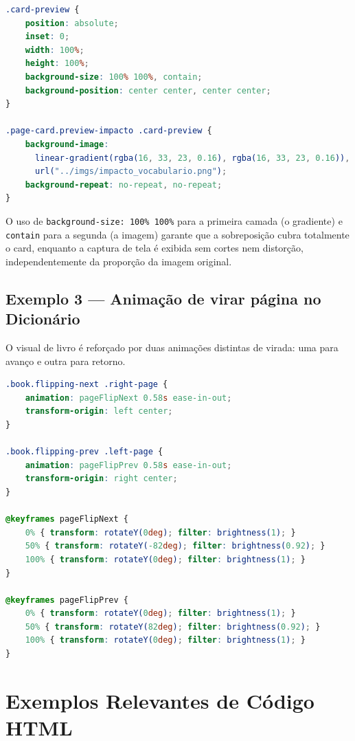 \documentclass[12pt,a4paper]{article}
\begin{document}
\begin{lstlisting}[language=CSS,caption={Preview ocupando todo o card e exibindo imagem completa}]
.card-preview {
    position: absolute;
    inset: 0;
    width: 100%;
    height: 100%;
    background-size: 100% 100%, contain;
    background-position: center center, center center;
}

.page-card.preview-impacto .card-preview {
    background-image:
      linear-gradient(rgba(16, 33, 23, 0.16), rgba(16, 33, 23, 0.16)),
      url("../imgs/impacto_vocabulario.png");
    background-repeat: no-repeat, no-repeat;
}
\end{lstlisting}

O uso de \texttt{background-size: 100\% 100\%} para a primeira camada (o gradiente) e
\texttt{contain} para a segunda (a imagem) garante que a sobreposição cubra totalmente o card,
enquanto a captura de tela é exibida sem cortes nem distorção, independentemente da proporção da
imagem original.

\subsection{Exemplo 3 — Animação de virar página no Dicionário}

O visual de livro é reforçado por duas animações distintas de virada: uma para avanço e outra
para retorno.

\begin{lstlisting}[language=CSS, caption={Animação de virada de página}]
.book.flipping-next .right-page {
    animation: pageFlipNext 0.58s ease-in-out;
    transform-origin: left center;
}

.book.flipping-prev .left-page {
    animation: pageFlipPrev 0.58s ease-in-out;
    transform-origin: right center;
}

@keyframes pageFlipNext {
    0% { transform: rotateY(0deg); filter: brightness(1); }
    50% { transform: rotateY(-82deg); filter: brightness(0.92); }
    100% { transform: rotateY(0deg); filter: brightness(1); }
}

@keyframes pageFlipPrev {
    0% { transform: rotateY(0deg); filter: brightness(1); }
    50% { transform: rotateY(82deg); filter: brightness(0.92); }
    100% { transform: rotateY(0deg); filter: brightness(1); }
}
\end{lstlisting}

\section{Exemplos Relevantes de Código HTML}
\label{sec:exemplo-html}
\end{document}
